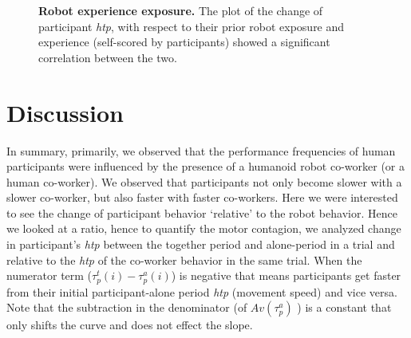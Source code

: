 \documentclass[a4paper, 12pt, oneside]{Thesis}  %
\begin{document}
\begin{figure}[hpt]
	\caption{{\bf Robot experience exposure.} The plot of the change of participant {\it htp}, with respect to their prior robot exposure and experience (self-scored by participants) showed a significant correlation between the two.}
	\label{fig:corelation}
\end{figure}



\clearpage
\section{Discussion}
In summary, primarily, we observed that the performance frequencies of human participants were influenced by the presence of a humanoid robot co-worker (or a human co-worker). We observed that participants not only become slower with a slower co-worker, but also faster with faster co-workers. Here we were interested to see the change of participant behavior `relative' to the robot behavior. Hence we looked at a ratio, hence to quantify the motor contagion, we analyzed change in participant's \textit{htp} between the together period and alone-period in a trial and relative to the {\it htp} of the co-worker behavior in the same trial. When the numerator term ($\tau_p^t(i)-\tau_p^a(i)$) is negative that means participants get faster from their initial participant-alone period \textit{htp} (movement speed) and vice versa. Note that the subtraction in the denominator (of $Av(\tau_p^a)$ ) is a constant that only shifts the curve and does not effect the slope.  
\end{document}

